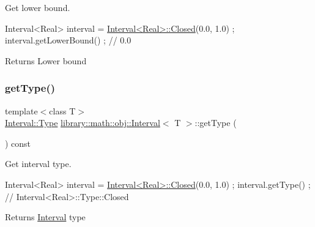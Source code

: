 Get lower bound. 


\begin{DoxyCode}
Interval<Real> interval = \hyperlink{classlibrary_1_1math_1_1obj_1_1_interval_aae8bb2b89af450729338d48563def4d7}{Interval<Real>::Closed}(0.0, 1.0) ;
interval.getLowerBound() ; \textcolor{comment}{// 0.0}
\end{DoxyCode}


\begin{DoxyReturn}{Returns}
Lower bound 
\end{DoxyReturn}
\mbox{\label{classlibrary_1_1math_1_1obj_1_1_interval_a881ab7e17883b4f1553d7e8ba9cc7656}} 
\subsubsection{\texorpdfstring{get\+Type()}{getType()}}
{\footnotesize\ttfamily template$<$class T$>$ \\
\hyperlink{classlibrary_1_1math_1_1obj_1_1_interval_abc7177f1c446d8273e70c989953667d1}{Interval\+::\+Type} \hyperlink{classlibrary_1_1math_1_1obj_1_1_interval}{library\+::math\+::obj\+::\+Interval}$<$ T $>$\+::get\+Type (\begin{DoxyParamCaption}{ }\end{DoxyParamCaption}) const}



Get interval type. 


\begin{DoxyCode}
Interval<Real> interval = \hyperlink{classlibrary_1_1math_1_1obj_1_1_interval_aae8bb2b89af450729338d48563def4d7}{Interval<Real>::Closed}(0.0, 1.0) ;
interval.getType() ; \textcolor{comment}{// Interval<Real>::Type::Closed}
\end{DoxyCode}


\begin{DoxyReturn}{Returns}
\hyperlink{classlibrary_1_1math_1_1obj_1_1_interval}{Interval} type 
\end{DoxyReturn}
\mbox{\label{classlibrary_1_1math_1_1obj_1_1_interval_a4183db388b6a63429a031d3687b20ecf}} 
